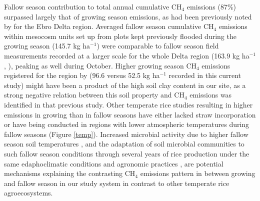 Fallow season contribution to total annual cumulative CH$_{4}$ emissions (87\%) surpassed largely that of growing season emissions, as had been previously noted by \cite{martinez2018neglecting} for the Ebro Delta region. Averaged fallow season cumulative CH$_{4}$ emissions within mesocosm units set up from plots kept previously flooded during the growing season (145.7 kg ha$^{-1}$) were comparable to fallow season field measurements recorded at a larger scale for the whole Delta region (163.9 kg ha$^{-1}$, \cite{martinez-eixarch2021a}), peaking as well during October. Higher growing season CH$_{4}$ emissions registered for the region by \cite{martinez-eixarch2021a} (96.6 versus 52.5 kg ha$^{-1}$ recorded in this current study) might have been a product of the high soil clay content in our site, as a strong negative relation between this soil property and CH$_{4}$ emissions was identified in that previous study. Other temperate rice studies resulting in higher emissions in growing than in fallow seasons have either lacked straw incorporation \citep{reba2019} or have being conducted in regions with lower atmospheric temperatures during fallow seasons \citep{fitzgerald2000, adviento-borbe2013, lahue2016, peyron2016, wust-galley2023} (Figure \ref{temp}). Increased microbial activity due to higher fallow season soil temperatures \citep{conrad2023}, and the adaptation of soil microbial communities to such fallow season conditions through several years of rice production under the same edaphoclimatic conditions and agronomic practices \citep{jangid2011, lagomarsino2016a, conrad2020, hester2022}, are potential mechanisms explaining the contrasting CH$_{4}$ emissions pattern in between growing and fallow season in our study system in contrast to other temperate rice agroecosystems. \\ 

